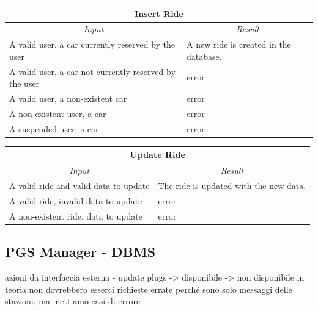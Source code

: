 \documentclass[english]{article}
\begin{document}
\begin{center}

	\begin{tabular}{ | p{6cm} | p{6cm} | }
		\hline 
		\multicolumn{2}{|c|}{\textbf{Insert Ride}} \\
		\hline
		\multicolumn{1}{|c|}{\textit{Input}} & \multicolumn{1}{c|}{\textit{Result}} \\
		\hline
		A valid user, a car currently reserved by the user & A new ride is created in the database. \\
		\hline
		A valid user, a car not currently reserved by the user & error \\
		\hline
		A valid user, a non-existent car & error \\
		\hline
		A non-existent user, a car & error \\
		\hline
		A suspended user, a car & error \\
		\hline
	\end{tabular}
\end{center}


\begin{center}

	\begin{tabular}{ | p{6cm} | p{6cm} | }
		\hline 
		\multicolumn{2}{|c|}{\textbf{Update Ride}} \\
		\hline
		\multicolumn{1}{|c|}{\textit{Input}} & \multicolumn{1}{c|}{\textit{Result}} \\
		\hline
		A valid ride and valid data to update  & The ride is updated with the new data. \\
		\hline
		A valid ride, invalid data to update & error \\
		\hline
		A non-existent ride, data to update & error \\
		\hline
	\end{tabular}
\end{center}

\subsection{PGS Manager - DBMS}
azioni da interfaccia esterna
- update plugs
	-> disponibile
	-> non disponibile
in teoria non dovrebbero esserci richieste errate perché sono solo messaggi delle stazioni, ma mettiamo casi di errore
\end{document}
